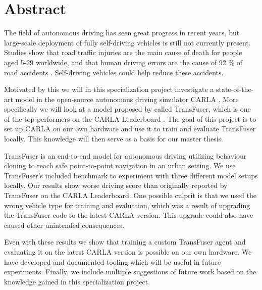 \chapter*{Abstract}
The field of autonomous driving has seen great progress in recent years, but large-scale deployment of fully self-driving vehicles is still not currently present. Studies show that road traffic injuries are the main cause of death for people aged 5-29 worldwide, and that human driving errors are the cause of 92 \% of road accidents \cite{WHO-road-safety-report, towards-connected-autonomous-driving}. Self-driving vehicles could help reduce these accidents.

Motivated by this we will in this specialization project investigate a state-of-the-art model in the open-source autonomous driving simulator CARLA \cite{introducing-carla-paper}. More specifically we will look at a model proposed by \textcite{transfuser-pami} called TransFuser, which is one of the top performers on the CARLA Leaderboard \cite{carla-leaderboard}. The goal of this project is to set up CARLA on our own hardware and use it to train and evaluate TransFuser locally. This knowledge will then serve as a basis for our master thesis.

TransFuser is an end-to-end model for autonomous driving utilizing behaviour cloning to reach safe point-to-point navigation in an urban setting. We use TransFuser's included benchmark to experiment with three different model setups locally.
Our results show worse driving score than originally reported by TransFuser on the CARLA Leaderboard. One possible culprit is that we used the wrong vehicle type for training and evaluation, which was a result of upgrading the TransFuser code to the latest CARLA version.
This upgrade could also have caused other unintended consequences.

Even with these results we show that training a custom TransFuser agent and evaluating it on the latest CARLA version is possible on our own hardware. We have developed and documented tooling which will be useful in future experiments. Finally, we include multiple suggestions of future work based on the knowledge gained in this specialization project.

